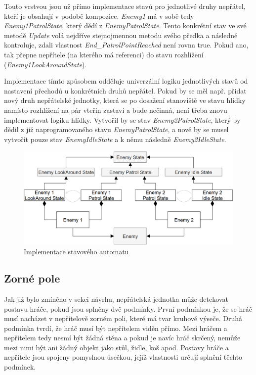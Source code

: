 \documentclass[FM,Proj,bw]{tulthesis}
\begin{document}
	Touto vrstvou jsou už přímo implementace stavů pro jednotlivé druhy nepřátel, kteří je obsahují v podobě kompozice. \textit{Enemy1} má v sobě tedy \textit{Enemy1PatrolState}, který dědí z \textit{EnemyPatrolState}. Tento konkrétní stav ve své metodě \textit{Update} volá nejdříve stejnojmennou metodu svého předka a následně kontroluje, zdali vlastnost \textit{End\_PatrolPointReached} není rovna true. Pokud ano, tak přepne nepřítele (na kterého má referenci) do stavu rozhlížení (\textit{Enemy1LookAroundState}).
	
	Implementace tímto způsobem odděluje univerzální logiku jednotlivých stavů od nastavení přechodů u konkrétních druhů nepřátel. Pokud by se měl např. přidat nový druh nepřátelské jednotky, která se po dosažení stanoviště ve stavu hlídky namísto rozhlížení na pár vteřin zastaví a bude nečinná, není třeba znovu implementovat logiku hlídky. Vytvořil by se stav \textit{Enemy2PatrolState}, který by dědil z již naprogramovaného stavu \textit{EnemyPatrolState}, a nově by se musel vytvořit pouze stav \textit{EnemyIdleState} a k němu následně \textit{Enemy2IdleState}.
		 
	\begin{figure}[ht]
		\centering
		\includegraphics[width=\textwidth]{img/FSM_Specific}
		\caption{Implementace stavového automatu}		
	\end{figure}
		 
	\subsection{Zorné pole}
	
	Jak již bylo zmíněno v sekci návrhu, nepřátelská jednotka může detekovat postavu hráče, pokud jsou splněny dvě podmínky. První podmínkou je, že se hráč musí nacházet v nepřítelově zorném poli, které má tvar kruhové výseče. Druhá podmínka tvrdí, že hráč musí být nepřítelem viděn přímo. Mezi hráčem a nepřítelem tedy nesmí být žádná stěna a pokud je navíc hráč skrčený, nemůže mezi nimi být ani žádný objekt jako stůl, židle, koš apod. Postavy hráče a nepřítele jsou spojeny pomyslnou úsečkou, jejíž vlastnosti určují splnění těchto podmínek.
	
\end{document}
